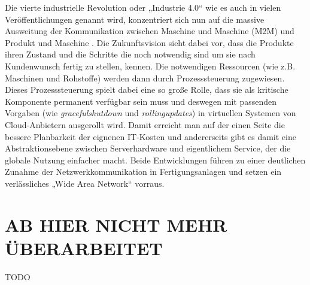 Die vierte industrielle Revolution oder „Industrie 4.0“ wie es auch in vielen Veröffentlichungen genannt wird, konzentriert sich nun auf die massive Ausweitung der Kommunikation zwischen Maschine und Maschine (\Gls{M2M}) und Produkt und Maschine \cite{lasi2014industry}. Die Zukunftsvision sieht dabei vor, dass die Produkte ihren Zustand und die Schritte die noch notwendig sind um sie nach Kundenwunsch fertig zu stellen, kennen. Die notwendigen Ressourcen (wie z.B. Maschinen und Rohstoffe) werden dann durch Prozesssteuerung zugewiesen. Dieses Prozesssteuerung spielt dabei eine so große Rolle, dass sie als kritische Komponente permanent verfügbar sein muss und deswegen mit passenden Vorgaben (wie \textit{\gls{gracefulshutdown}} und \textit{\Gls{rollingupdates}}) in virtuellen Systemen von Cloud-Anbietern ausgerollt wird. Damit erreicht man auf der einen Seite die bessere Planbarkeit der eignenen IT-Kosten und andererseits gibt es damit eine Abstraktionsebene zwischen Serverhardware und eigentlichem Service, der die globale Nutzung einfacher macht\cite{wollschlaeger2017future}. Beide Entwicklungen führen zu einer deutlichen Zunahme der Netzwerkkommunikation in Fertigungsanlagen und setzen ein verlässliches „Wide Area Network“ vorraus.\\

\section{AB HIER NICHT MEHR ÜBERARBEITET}
TODO

